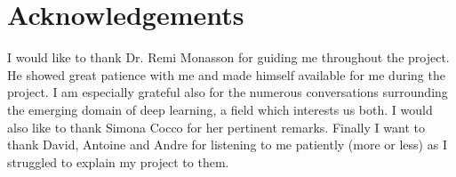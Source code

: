\documentclass[a4paper, 12pt]{article}
\begin{document}
\section*{Acknowledgements}
I would like to thank Dr. Remi Monasson for guiding me throughout the project. He showed great patience with me and made himself available for me during the project. I am especially grateful also for the numerous conversations surrounding the emerging domain of deep learning, a field which interests us both. I would also like to thank Simona Cocco for her pertinent remarks. Finally I want to thank David, Antoine and Andre for listening to me patiently (more or less) as I struggled to explain my project to them. 
\end{document}
